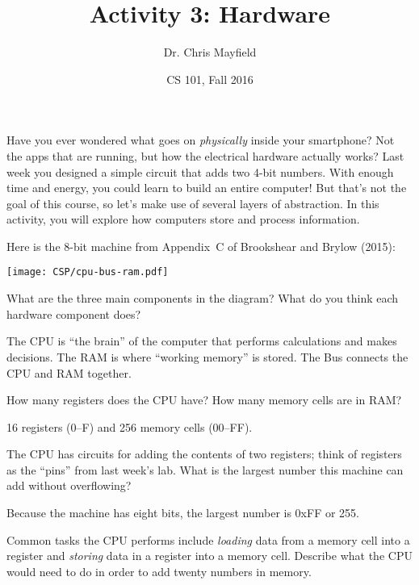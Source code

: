 \documentclass[12pt]{article}
\title{Activity 3: Hardware}
\author{Dr. Chris Mayfield}
\date{CS 101, Fall 2016}
\begin{document}
\maketitle

Have you ever wondered what goes on \emph{physically} inside your smartphone?
Not the apps that are running, but how the electrical hardware actually works?
Last week you designed a simple circuit that adds two 4-bit numbers.
With enough time and energy, you could learn to build an entire computer!
But that's not the goal of this course, so let's make use of several layers of abstraction.
In this activity, you will explore how computers store and process information.


\label{CSP/architecture}

Here is the 8-bit machine from Appendix~C of Brookshear and Brylow (2015):

\begin{center}
\texttt{[image: CSP/cpu-bus-ram.pdf]}
\end{center}




\Q What are the three main components in the diagram?
What do you think each hardware component does?

\begin{answer}
The CPU is ``the brain'' of the computer that performs calculations and makes decisions.
The RAM is where ``working memory'' is stored.
The Bus connects the CPU and RAM together.
\end{answer}


\Q How many registers does the CPU have? How many memory cells are in RAM?

\begin{answer}[3em]
16 registers (0--F) and 256 memory cells (00--FF).
\end{answer}


\Q The CPU has circuits for adding the contents of two registers; think of registers as the ``pins'' from last week's lab.
What is the largest number this machine can add without overflowing?

\begin{answer}
Because the machine has eight bits, the largest number is 0xFF or 255.
\end{answer}


\Q Common tasks the CPU performs include \emph{loading} data from a memory cell into a register and \emph{storing} data in a register into a memory cell.
Describe what the CPU would need to do in order to add twenty numbers in memory.
\end{document}

